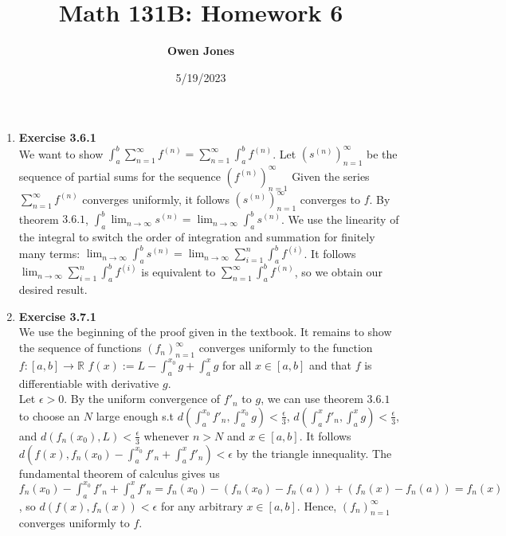 \documentclass[10pt]{article}
\title{\bf Math 131B: Homework 6}
\date{5/19/2023}
\author{\bf Owen Jones}
\begin{document}
\maketitle

\begin{enumerate}[label=Problem \arabic*.]
\item \textbf{Exercise 3.6.1}\\
We want to show $\int_{a}^{b}\displaystyle{\sum_{n=1}^{\infty}}f^{(n)}=\displaystyle{\sum_{n=1}^{\infty}}\int_{a}^{b}f^{(n)}$.
Let $(s^{(n)})^\infty_{n=1}$ be the sequence of partial sums for the sequence $(f^{(n)})^\infty_{n=1}$
Given the series $\displaystyle{\sum_{n=1}^{\infty}}f^{(n)}$ converges uniformly, it follows $(s^{(n)})^\infty_{n=1}$ converges to $f$.
By theorem $3.6.1$, $\displaystyle{\int_{a}^{b}\lim_{n\rightarrow\infty}}s^{(n)}=\displaystyle{\lim_{n\rightarrow\infty}}\int_{a}^{b}s^{(n)}$.
We use the linearity of the integral to switch the order of integration and summation for finitely many terms:
$\displaystyle{\lim_{n\rightarrow\infty}}\int_{a}^{b}s^{(n)}=\displaystyle{\lim_{n\rightarrow\infty}}\sum_{i=1}^{n}\int_{a}^{b}f^{(i)}$.
It follows $\displaystyle{\lim_{n\rightarrow\infty}}\sum_{i=1}^{n}\int_{a}^{b}f^{(i)}$ is equivalent to $\displaystyle{\sum_{n=1}^{\infty}}\int_{a}^{b}f^{(n)}$, so we obtain our desired result.
\item \textbf{Exercise 3.7.1}\\
We use the beginning of the proof given in the textbook. 
It remains to show the sequence of functions $(f_n)^{\infty}_{n=1}$ converges uniformly to the function $f:[a,b]\rightarrow\mathbb{R}$ $f(x):=L-\displaystyle{\int_{a}^{x_0}}g+\displaystyle{\int_{a}^{x}}g$ for all $x\in[a,b]$ and that $f$ is differentiable with derivative $g$.\\
Let $\epsilon>0$. By the uniform convergence of $f'_n$ to $g$, we can use theorem $3.6.1$ to choose an $N$ large enough s.t $d(\displaystyle{\int_{a}^{x_0}}f'_n,\int_{a}^{x_0}g)<\frac{\epsilon}{3}$, $\displaystyle d(\int_{a}^{x}f'_n,\int_{a}^{x}g)<\frac{\epsilon}{3}$, and $\displaystyle d(f_n(x_0),L)<\frac{\epsilon}{3}$ whenever $n>N$ and $x\in[a,b]$.
It follows $\displaystyle d(f(x),f_n(x_0)-\int_{a}^{x_0}f'_n+\int_{a}^{x}f'_n)<\epsilon$ by the triangle innequality. 
The fundamental theorem of calculus gives us $\displaystyle f_n(x_0)-\int_{a}^{x_0}f'_n+\int_{a}^{x}f'_n=f_n(x_0)-(f_n(x_0)-f_n(a))+(f_n(x)-f_n(a))=f_n(x)$, so $d(f(x),f_n(x))<\epsilon$ for any arbitrary $x\in[a,b]$.
Hence, $(f_n)^{\infty}_{n=1}$ converges uniformly to $f$.\\

\end{enumerate}
\end{document}
